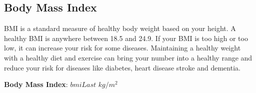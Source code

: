 \subsection{Body Mass Index}

BMI is a standard measure of healthy body weight based on your height. A healthy
BMI is anywhere between 18.5 and 24.9. If your BMI is too high or too low, it
can increase your risk for some diseases. Maintaining a healthy weight with a
healthy diet and exercise can bring your number into a healthy range and reduce
your risk for diseases like diabetes, heart disease stroke and dementia.

\begin{center}
    {\LARGE \textbf{Body Mass Index}: ${{bmiLast}}$ $kg/m^2$}
\end{center}
